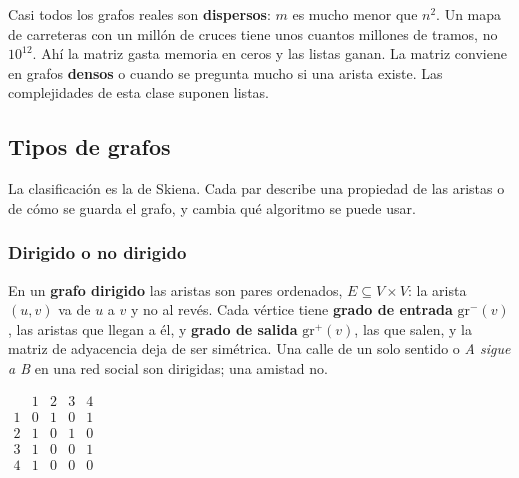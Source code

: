 \documentclass[11pt,letterpaper]{article}
\begin{document}
\begin{idea}
  Casi todos los grafos reales son \textbf{dispersos}: $m$ es mucho
  menor que $n^2$. Un mapa de carreteras con un millón de cruces tiene
  unos cuantos millones de tramos, no $10^{12}$. Ahí la matriz gasta
  memoria en ceros y las listas ganan. La matriz conviene en grafos
  \textbf{densos} o cuando se pregunta mucho si una arista existe.
  Las complejidades de esta clase suponen listas.
\end{idea}


\subsection*{Tipos de grafos}

La clasificación es la de Skiena. Cada par describe una propiedad de
las aristas o de cómo se guarda el grafo, y cambia qué algoritmo se
puede usar.

\subsubsection*{Dirigido o no dirigido}

En un \textbf{grafo dirigido} las aristas son pares ordenados,
$E \subseteq V \times V$: la arista $(u, v)$ va de $u$ a $v$ y no al
revés. Cada vértice tiene \textbf{grado de entrada}
$\text{gr}^{-}(v)$, las aristas que llegan a él, y \textbf{grado de
salida} $\text{gr}^{+}(v)$, las que salen, y la matriz de adyacencia
deja de ser simétrica. Una calle de un solo sentido o \textit{A sigue
a B} en una red social son dirigidas; una amistad no.

\begin{center}
\hspace{1.2cm}
$\begin{array}{c|cccc}
    & 1 & 2 & 3 & 4 \\ \hline
  1 & 0 & 1 & 0 & 1 \\
  2 & 1 & 0 & 1 & 0 \\
  3 & 1 & 0 & 0 & 1 \\
  4 & 1 & 0 & 0 & 0
\end{array}$
\end{center}
\end{document}

